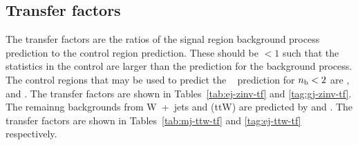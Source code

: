\begin{table}[h]
\begin{tabular}
\hline\hline
  \end{tabular}
\end{table}

\newpage
\subsection{Transfer factors}

The transfer factors are the ratios of the signal region background process
prediction to the control region prediction. These should be $\lt 1$ such that 
the statistics in the control are larger than the prediction for the background
process. The control regions that may be used to predict the \zInv~ prediction for $\nb < 2$ are
\mj, \ej and \gj. The transfer factors are shown in Tables~\ref{tab:ej-zinv-tf} and \ref{tag:gj-zinv-tf}. 
The remainng backgrounds from  W~+~jets and \ttbar (ttW) are predicted by \mj and \ej. 
The transfer factors are shown in Tables~\ref{tab:mj-ttw-tf} and \ref{tag:ej-ttw-tf} respectively.

